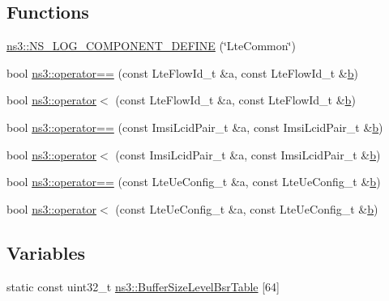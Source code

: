 \subsection*{Functions}
\begin{DoxyCompactItemize}
\item 
\hyperlink{namespacens3_a5a5d0f0ae8fab288755de75a82a0d4f2}{ns3\+::\+N\+S\+\_\+\+L\+O\+G\+\_\+\+C\+O\+M\+P\+O\+N\+E\+N\+T\+\_\+\+D\+E\+F\+I\+NE} (\char`\"{}Lte\+Common\char`\"{})
\item 
bool \hyperlink{namespacens3_a7eb2cd4fc0197d8a6f3adb405c1fd2c0}{ns3\+::operator==} (const Lte\+Flow\+Id\+\_\+t \&a, const Lte\+Flow\+Id\+\_\+t \&\hyperlink{lte__pathloss_8m_a21ad0bd836b90d08f4cf640b4c298e7c}{b})
\item 
bool \hyperlink{namespacens3_a203371e711ea05873aeee410f28edf4b}{ns3\+::operator$<$} (const Lte\+Flow\+Id\+\_\+t \&a, const Lte\+Flow\+Id\+\_\+t \&\hyperlink{lte__pathloss_8m_a21ad0bd836b90d08f4cf640b4c298e7c}{b})
\item 
bool \hyperlink{namespacens3_a912d4cf490b4606831d04c397567d70a}{ns3\+::operator==} (const Imsi\+Lcid\+Pair\+\_\+t \&a, const Imsi\+Lcid\+Pair\+\_\+t \&\hyperlink{lte__pathloss_8m_a21ad0bd836b90d08f4cf640b4c298e7c}{b})
\item 
bool \hyperlink{namespacens3_acde23b227e2512cdfc09e46a80334573}{ns3\+::operator$<$} (const Imsi\+Lcid\+Pair\+\_\+t \&a, const Imsi\+Lcid\+Pair\+\_\+t \&\hyperlink{lte__pathloss_8m_a21ad0bd836b90d08f4cf640b4c298e7c}{b})
\item 
bool \hyperlink{namespacens3_aa39a4a192751d69c888b893ac9b64a03}{ns3\+::operator==} (const Lte\+Ue\+Config\+\_\+t \&a, const Lte\+Ue\+Config\+\_\+t \&\hyperlink{lte__pathloss_8m_a21ad0bd836b90d08f4cf640b4c298e7c}{b})
\item 
bool \hyperlink{namespacens3_a39dfde3903eb28b8da1b73a1c1e1ee95}{ns3\+::operator$<$} (const Lte\+Ue\+Config\+\_\+t \&a, const Lte\+Ue\+Config\+\_\+t \&\hyperlink{lte__pathloss_8m_a21ad0bd836b90d08f4cf640b4c298e7c}{b})
\end{DoxyCompactItemize}
\subsection*{Variables}
\begin{DoxyCompactItemize}
\item 
static const uint32\+\_\+t \hyperlink{namespacens3_a693da1bbfe2b27cb7ebe207d565a67a8}{ns3\+::\+Buffer\+Size\+Level\+Bsr\+Table} \mbox{[}64\mbox{]}
\end{DoxyCompactItemize}
